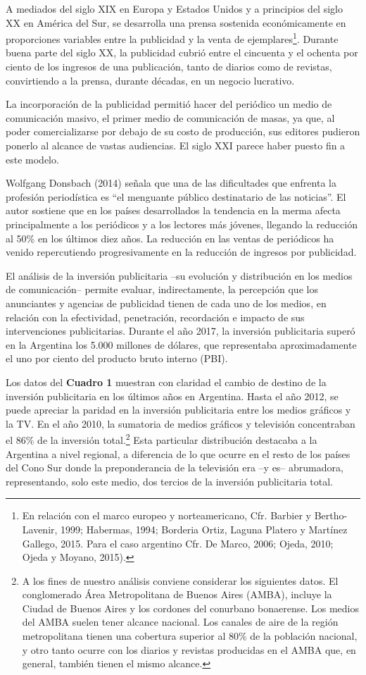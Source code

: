 A mediados del siglo XIX en Europa y Estados Unidos y a principios del siglo XX en América del Sur, se desarrolla una prensa sostenida económicamente en proporciones variables entre la publicidad y la venta de ejemplares\footnote{En relación con el marco europeo y norteamericano, Cfr. Barbier y Bertho-Lavenir, 1999; Habermas, 1994; Borderia Ortiz, Laguna Platero y Martínez Gallego, 2015. Para el caso argentino Cfr. De Marco, 2006; Ojeda, 2010; Ojeda y Moyano, 2015).}. Durante buena parte del siglo XX, la publicidad cubrió entre el cincuenta y el ochenta por ciento de los ingresos de una publicación, tanto de diarios como de revistas, convirtiendo a la prensa, durante décadas, en un negocio lucrativo.

La incorporación de la publicidad permitió hacer del periódico un medio de comunicación masivo, el primer medio de comunicación de masas, ya que, al poder comercializarse por debajo de su costo de producción, sus editores pudieron ponerlo al alcance de vastas audiencias. El siglo XXI parece haber puesto fin a este modelo.

Wolfgang Donsbach (2014) señala que una de las dificultades que enfrenta la profesión periodística es \enquote{el menguante público destinatario de las noticias}. El autor sostiene que en los países desarrollados la tendencia en la merma afecta principalmente a los periódicos y a los lectores más jóvenes, llegando la reducción al 50\% en los últimos diez años. La reducción en las ventas de periódicos ha venido repercutiendo progresivamente en la reducción de ingresos por publicidad.

El análisis de la inversión publicitaria --su evolución y distribución en los medios de comunicación-- permite evaluar, indirectamente, la percepción que los anunciantes y agencias de publicidad tienen de cada uno de los medios, en relación con la efectividad, penetración, recordación e impacto de sus intervenciones publicitarias. Durante el año 2017, la inversión publicitaria superó en la Argentina los 5.000 millones de dólares, que representaba aproximadamente el uno por ciento del producto bruto interno (PBI).

Los datos del \textbf{Cuadro 1} muestran con claridad el cambio de destino de la inversión publicitaria en los últimos años en Argentina. Hasta el año 2012, se puede apreciar la paridad en la inversión publicitaria entre los medios gráficos y la TV. En el año 2010, la sumatoria de medios gráficos y televisión concentraban el 86\% de la inversión total.\footnote{A los fines de nuestro análisis conviene considerar los siguientes datos. El conglomerado Área Metropolitana de Buenos Aires (AMBA), incluye la Ciudad de Buenos Aires y los cordones del conurbano bonaerense. Los medios del AMBA suelen tener alcance nacional. Los canales de aire de la región metropolitana tienen una cobertura superior al 80\% de la población nacional, y otro tanto ocurre con los diarios y revistas producidas en el AMBA que, en general, también tienen el mismo alcance.} Esta particular distribución destacaba a la Argentina a nivel regional, a diferencia de lo que ocurre en el resto de los países del Cono Sur donde la preponderancia de la televisión era --y es-- abrumadora, representando, solo este medio, dos tercios de la inversión publicitaria total.

